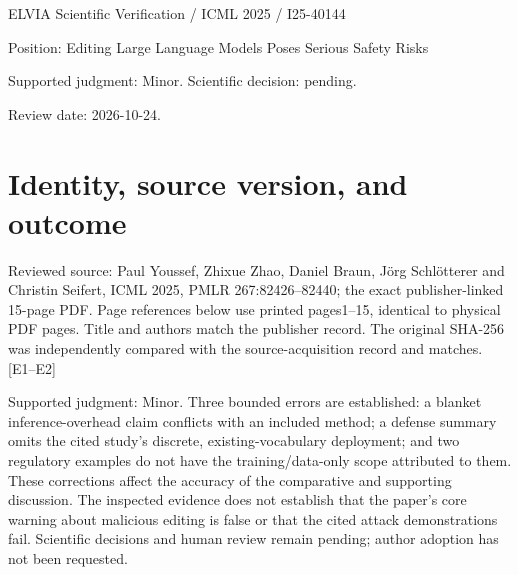 \documentclass[10pt]{article}
\begin{document}
ELVIA Scientific Verification / ICML 2025 / I25-40144\par
Position: Editing Large Language Models Poses Serious Safety Risks\par
Supported judgment: Minor. Scientific decision: pending.\par
Review date: 2026-10-24.\par
\section*{Identity, source version, and outcome}
Reviewed source: Paul Youssef, Zhixue Zhao, Daniel Braun, Jörg Schlötterer and Christin Seifert, ICML 2025, PMLR 267:82426–82440; the exact publisher-linked 15-page PDF. Page references below use printed pages1–15, identical to physical PDF pages. Title and authors match the publisher record. The original SHA-256 was independently compared with the source-acquisition record and matches. [E1–E2]\par
Supported judgment: Minor. Three bounded errors are established: a blanket inference-overhead claim conflicts with an included method; a defense summary omits the cited study’s discrete, existing-vocabulary deployment; and two regulatory examples do not have the training/data-only scope attributed to them. These corrections affect the accuracy of the comparative and supporting discussion. The inspected evidence does not establish that the paper’s core warning about malicious editing is false or that the cited attack demonstrations fail. Scientific decisions and human review remain pending; author adoption has not been requested.\par
\end{document}
